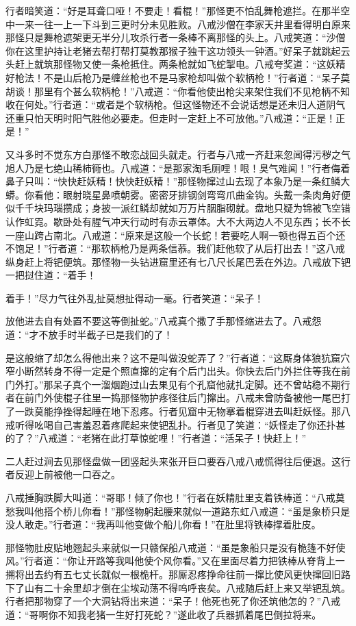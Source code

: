 \documentclass[12pt,UTF8]{ctexbook}
\begin{document}
行者暗笑道：“好是耳聋口哑！不要走！看棍！”那怪更不怕乱舞枪遮拦。在那半空中一来一往一上一下斗到三更时分未见胜败。八戒沙僧在李家天井里看得明白原来那怪只是舞枪遮架更无半分儿攻杀行者一条棒不离那怪的头上。八戒笑道：“沙僧你在这里护持让老猪去帮打帮打莫教那猴子独干这功领头一钟酒。”好呆子就跳起云头赶上就筑那怪物又使一条枪抵住。两条枪就如飞蛇掣电。八戒夸奖道：“这妖精好枪法！不是山后枪乃是缠丝枪也不是马家枪却叫做个软柄枪！”行者道：“呆子莫胡谈！那里有个甚么软柄枪！”八戒道：“你看他使出枪尖来架住我们不见枪柄不知收在何处。”行者道：“或者是个软柄枪。但这怪物还不会说话想是还未归人道阴气还重只怕天明时阳气胜他必要走。但走时一定赶上不可放他。”八戒道：“正是！正是！”

又斗多时不觉东方白那怪不敢恋战回头就走。行者与八戒一齐赶来忽闻得污秽之气旭人乃是七绝山稀柿衕也。八戒道：“是那家淘毛厕哩！哏！臭气难闻！”行者侮着鼻子只叫：“快快赶妖精！快快赶妖精！”那怪物撺过山去现了本象乃是一条红鳞大蟒。你看他：眼射晓星鼻喷朝雾。密密牙排钢剑弯弯爪曲金钩。头戴一条肉角好便似千千块玛瑙攒成；身披一派红鳞却就如万万片胭脂砌就。盘地只疑为锦被飞空错认作虹霓。歇卧处有腥气冲天行动时有赤云罩体。大不大两边人不见东西；长不长一座山跨占南北。八戒道：“原来是这般一个长蛇！若要吃人啊一顿也得五百个还不饱足！”行者道：“那软柄枪乃是两条信菾。我们赶他软了从后打出去！”这八戒纵身赶上将钯便筑。那怪物一头钻进窟里还有七八尺长尾巴丢在外边。八戒放下钯一把挝住道：“着手！

着手！”尽力气往外乱扯莫想扯得动一毫。行者笑道：“呆子！

放他进去自有处置不要这等倒扯蛇。”八戒真个撒了手那怪缩进去了。八戒怨道：“才不放手时半截子已是我们的了！

是这般缩了却怎么得他出来？这不是叫做没蛇弄了？”行者道：“这厮身体狼犺窟穴窄小断然转身不得一定是个照直撺的定有个后门出头。你快去后门外拦住等我在前门外打。”那呆子真个一溜烟跑过山去果见有个孔窟他就扎定脚。还不曾站稳不期行者在前门外使棍子往里一捣那怪物护疼径往后门撺出。八戒未曾防备被他一尾巴打了一跌莫能挣挫得起睡在地下忍疼。行者见窟中无物搴着棍穿进去叫赶妖怪。那八戒听得吆喝自己害羞忍着疼爬起来使钯乱扑。行者见了笑道：“妖怪走了你还扑甚的了？”八戒道：“老猪在此打草惊蛇哩！”行者道：“活呆子！快赶上！”

二人赶过涧去见那怪盘做一团竖起头来张开巨口要吞八戒八戒慌得往后便退。这行者反迎上前被他一口吞之。

八戒捶胸跌脚大叫道：“哥耶！倾了你也！”行者在妖精肚里支着铁棒道：“八戒莫愁我叫他搭个桥儿你看！”那怪物躬起腰来就似一道路东虹八戒道：“虽是象桥只是没人敢走。”行者道：“我再叫他变做个船儿你看！”在肚里将铁棒撑着肚皮。

那怪物肚皮贴地翘起头来就似一只赣保船八戒道：“虽是象船只是没有桅篷不好使风。”行者道：“你让开路等我叫他使个风你看。”又在里面尽着力把铁棒从脊背上一搠将出去约有五七丈长就似一根桅杆。那厮忍疼挣命往前一撺比使风更快撺回旧路下了山有二十余里却才倒在尘埃动荡不得呜呼丧矣。八戒随后赶上来又举钯乱筑。行者把那物穿了一个大洞钻将出来道：“呆子！他死也死了你还筑他怎的？”八戒道：“哥啊你不知我老猪一生好打死蛇？”遂此收了兵器抓着尾巴倒拉将来。
\end{document}
